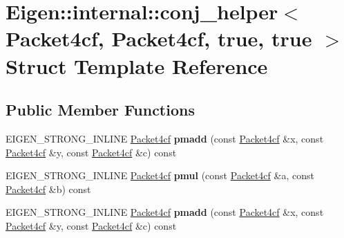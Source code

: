 \hypertarget{struct_eigen_1_1internal_1_1conj__helper_3_01_packet4cf_00_01_packet4cf_00_01true_00_01true_01_4}{}\section{Eigen\+:\+:internal\+:\+:conj\+\_\+helper$<$ Packet4cf, Packet4cf, true, true $>$ Struct Template Reference}
\label{struct_eigen_1_1internal_1_1conj__helper_3_01_packet4cf_00_01_packet4cf_00_01true_00_01true_01_4}
\subsection*{Public Member Functions}
\begin{DoxyCompactItemize}
\item 
\mbox{\label{struct_eigen_1_1internal_1_1conj__helper_3_01_packet4cf_00_01_packet4cf_00_01true_00_01true_01_4_a4edcd637a905735fd9d8f0158eaa5fe3}} 
E\+I\+G\+E\+N\+\_\+\+S\+T\+R\+O\+N\+G\+\_\+\+I\+N\+L\+I\+NE \hyperlink{struct_eigen_1_1internal_1_1_packet4cf}{Packet4cf} {\bfseries pmadd} (const \hyperlink{struct_eigen_1_1internal_1_1_packet4cf}{Packet4cf} \&x, const \hyperlink{struct_eigen_1_1internal_1_1_packet4cf}{Packet4cf} \&y, const \hyperlink{struct_eigen_1_1internal_1_1_packet4cf}{Packet4cf} \&c) const
\item 
\mbox{\label{struct_eigen_1_1internal_1_1conj__helper_3_01_packet4cf_00_01_packet4cf_00_01true_00_01true_01_4_aaaa36dbafeef9a405bbd0dead0fa4d9d}} 
E\+I\+G\+E\+N\+\_\+\+S\+T\+R\+O\+N\+G\+\_\+\+I\+N\+L\+I\+NE \hyperlink{struct_eigen_1_1internal_1_1_packet4cf}{Packet4cf} {\bfseries pmul} (const \hyperlink{struct_eigen_1_1internal_1_1_packet4cf}{Packet4cf} \&a, const \hyperlink{struct_eigen_1_1internal_1_1_packet4cf}{Packet4cf} \&b) const
\item 
\mbox{\label{struct_eigen_1_1internal_1_1conj__helper_3_01_packet4cf_00_01_packet4cf_00_01true_00_01true_01_4_a4edcd637a905735fd9d8f0158eaa5fe3}} 
E\+I\+G\+E\+N\+\_\+\+S\+T\+R\+O\+N\+G\+\_\+\+I\+N\+L\+I\+NE \hyperlink{struct_eigen_1_1internal_1_1_packet4cf}{Packet4cf} {\bfseries pmadd} (const \hyperlink{struct_eigen_1_1internal_1_1_packet4cf}{Packet4cf} \&x, const \hyperlink{struct_eigen_1_1internal_1_1_packet4cf}{Packet4cf} \&y, const \hyperlink{struct_eigen_1_1internal_1_1_packet4cf}{Packet4cf} \&c) const

\end{DoxyCompactItemize}
